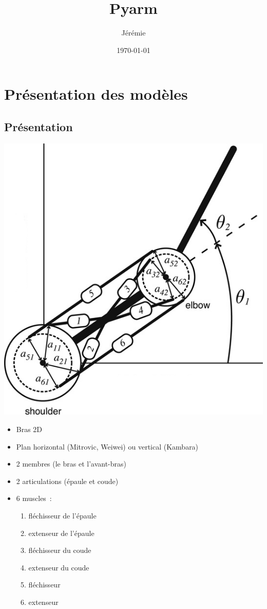 \documentclass[pdftex,a4paper,11pt]{article}
\begin{document}
\title{Pyarm}
\author{
	Jérémie 
}
\date{\today{}}

\maketitle


\section{Présentation des modèles}

\subsection{Présentation}

\begin{center}
        \includegraphics[width=.40\linewidth]{fig/arm}
\end{center}

\begin{itemize}
    \item Bras 2D
    \item Plan horizontal (Mitrovic, Weiwei) ou vertical (Kambara)
    \item 2 membres (le bras et l'avant-bras) %
    \item 2 articulations (épaule et coude)
    \item 6 muscles~:
    \begin{enumerate}
        \item fléchisseur de l'épaule
        \item extenseur de l'épaule
        \item fléchisseur du coude
        \item extenseur du coude
        \item fléchisseur
        \item extenseur
    \end{enumerate}
\end{itemize}
\end{document}
